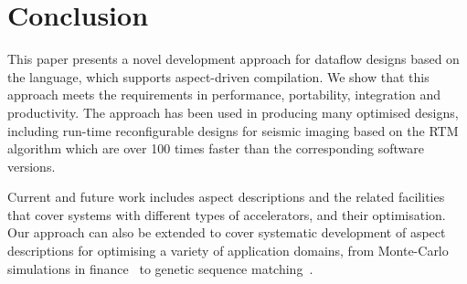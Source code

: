 \section{Conclusion}

This paper presents a novel development approach for dataflow designs
based on the \MAXC{} language, which supports aspect-driven
compilation. We show that this approach meets the requirements in
performance, portability, integration and productivity. The approach
has been used in producing many optimised designs, including run-time
reconfigurable designs for seismic imaging based on the RTM algorithm
which are over 100 times faster than the corresponding software
versions.

Current and future work includes aspect descriptions and the related
facilities that cover systems with different types of accelerators,
and their optimisation. Our approach can also be extended to cover
systematic development of aspect descriptions for optimising a variety
of application domains, from Monte-Carlo simulations in
finance~\cite{Jin:2012} to genetic sequence
matching~\cite{Arram:2013}.
